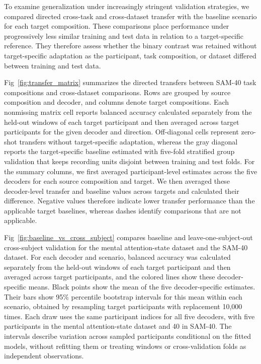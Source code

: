 \documentclass[10pt,letterpaper]{article}
\begin{document}
To examine generalization under increasingly stringent validation strategies,
we compared directed cross-task and cross-dataset transfer with the
baseline scenario for each target composition. These comparisons place
performance under progressively less similar training and test data in relation
to a target-specific reference. They therefore assess whether the binary
contrast was retained without target-specific adaptation as the participant,
task composition, or dataset differed between training and test data.

Fig~\ref{fig:transfer_matrix} summarizes the directed transfers between SAM-40 task compositions and
cross-dataset comparisons. Rows are grouped by source composition and decoder,
and columns denote target compositions. Each nonmissing matrix cell reports
balanced accuracy calculated separately from the held-out windows of each
target participant and then averaged across target participants for the given
decoder and direction. Off-diagonal cells represent zero-shot transfers without
target-specific adaptation, whereas the gray diagonal reports the
target-specific baseline estimated with five-fold stratified group validation
that keeps recording units disjoint between training and test folds. For the
summary columns, we first averaged
participant-level estimates across the five decoders for each source composition and target. We then
averaged these decoder-level transfer and baseline values across targets and
calculated their difference.
Negative values therefore indicate lower transfer performance than the
applicable target baselines, whereas dashes identify comparisons that are not
applicable.

Fig~\ref{fig:baseline_vs_cross_subject} compares baseline and
leave-one-subject-out cross-subject validation for the mental attention-state
dataset and the SAM-40 dataset. For each decoder and scenario, balanced accuracy was
calculated separately from the held-out windows of each target participant and
then averaged across target participants, and the colored lines show these
decoder-specific means. Black points show the mean of the five decoder-specific
estimates. Their bars show 95\% percentile bootstrap intervals for this mean within
each scenario, obtained by resampling target participants with replacement
10,000 times. Each draw uses the same participant indices for all five
decoders, with five participants in the mental attention-state dataset and
40 in SAM-40. The intervals describe variation across sampled participants
conditional on the fitted models, without refitting them or treating windows
or cross-validation folds as independent observations.
\end{document}
